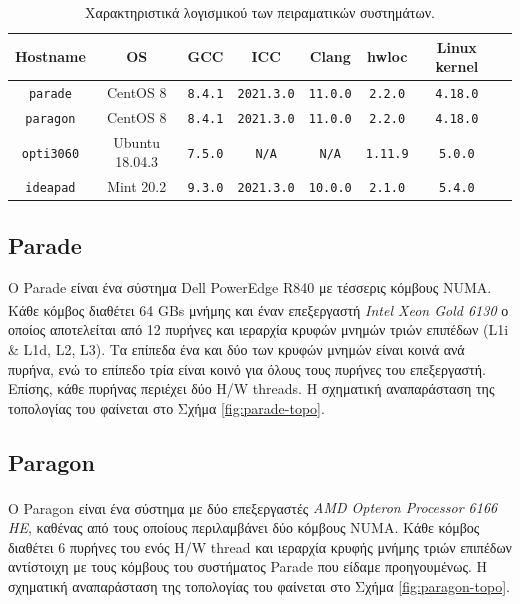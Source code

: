 \begin{table}
	\centering
		\begin{tabular}{|c||c|c|c|c|c|c|c|}
		\hline
		Hostname & OS & GCC & ICC & Clang & hwloc & Linux kernel \\
		\hline \hline
		\texttt{parade} & CentOS 8 & \texttt{8.4.1} & \texttt{2021.3.0} & \texttt{11.0.0} & \texttt{2.2.0} & \texttt{4.18.0} \\
		\hline
		\texttt{paragon} & CentOS 8 & \texttt{8.4.1} & \texttt{2021.3.0} & \texttt{11.0.0} & \texttt{2.2.0} & \texttt{4.18.0} \\
		\hline
		\texttt{opti3060} & Ubuntu 18.04.3 & \texttt{7.5.0} & \texttt{N/A} & \texttt{N/A} & \texttt{1.11.9} & \texttt{5.0.0} \\
		\hline
		\texttt{ideapad} & Mint 20.2 & \texttt{9.3.0} & \texttt{2021.3.0} & \texttt{10.0.0} & \texttt{2.1.0} & \texttt{5.4.0} \\
		\hline
		\end{tabular}
		\caption{Χαρακτηριστικά λογισμικού των πειραματικών συστημάτων.}
		\label{tab:exp-systems-software}
\end{table}


\subsection{Parade}
Ο Parade είναι ένα σύστημα Dell PowerEdge R840 με τέσσερις κόμβους NUMA. Κάθε κόμβος διαθέτει 64 GBs μνήμης και έναν επεξεργαστή \textit{Intel\textsuperscript{\textregistered} Xeon\textsuperscript{\textregistered} Gold 6130} ο οποίος αποτελείται από 12 πυρήνες και ιεραρχία κρυφών μνημών τριών επιπέδων (L1i \& L1d, L2, L3). Τα επίπεδα ένα και δύο των κρυφών μνημών είναι κοινά ανά πυρήνα, ενώ το επίπεδο τρία είναι κοινό για όλους τους πυρήνες του επεξεργαστή. Επίσης, κάθε πυρήνας περιέχει δύο H/W threads. Η σχηματική αναπαράσταση της τοπολογίας του φαίνεται στο Σχήμα \ref{fig:parade-topo}.

\subsection{Paragon}
Ο Paragon είναι ένα σύστημα με δύο επεξεργαστές \textit{AMD Opteron\textsuperscript{\texttrademark} Processor 6166 HE}, καθένας από τους οποίους περιλαμβάνει δύο κόμβους NUMA. Κάθε κόμβος διαθέτει 6 πυρήνες του ενός H/W thread και ιεραρχία κρυφής μνήμης τριών επιπέδων αντίστοιχη με τους κόμβους του συστήματος Parade που είδαμε προηγουμένως. Η σχηματική αναπαράσταση της τοπολογίας του φαίνεται στο Σχήμα \ref{fig:paragon-topo}.

